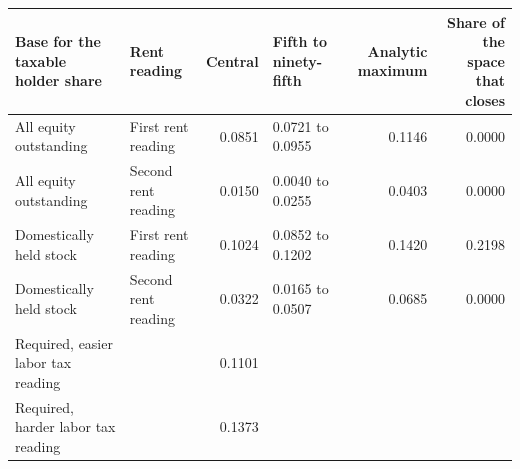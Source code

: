 \setlength{\tabcolsep}{4pt}
\begin{tabular}{p{2.9cm}p{2.2cm}rp{2.1cm}rr}
\toprule
Base for the taxable holder share & Rent reading & Central & Fifth to ninety-fifth & Analytic maximum & Share of the space that closes \\
\midrule
All equity outstanding & First rent reading & 0.0851 & 0.0721 to 0.0955 & 0.1146 & 0.0000 \\
All equity outstanding & Second rent reading & 0.0150 & 0.0040 to 0.0255 & 0.0403 & 0.0000 \\
Domestically held stock & First rent reading & 0.1024 & 0.0852 to 0.1202 & 0.1420 & 0.2198 \\
Domestically held stock & Second rent reading & 0.0322 & 0.0165 to 0.0507 & 0.0685 & 0.0000 \\
\midrule
Required, easier labor tax reading & & 0.1101 & & & \\
Required, harder labor tax reading & & 0.1373 & & & \\
\bottomrule
\end{tabular}
